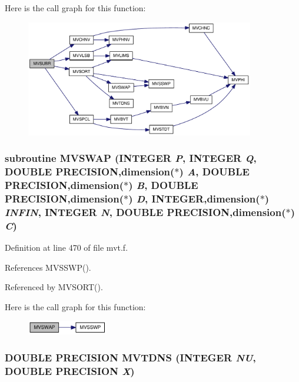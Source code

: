 Here is the call graph for this function:\nopagebreak
\begin{figure}[H]
\begin{center}
\leavevmode
\includegraphics[width=283pt]{mvt_8f_1e3a3eb63d17fe37f686fc1f571beccc_cgraph}
\end{center}
\end{figure}
\hypertarget{mvt_8f_5411cfeafe20ca2bd17c962f8c8c0e84}{
\subsubsection[{MVSWAP}]{\setlength{\rightskip}{0pt plus 5cm}subroutine MVSWAP (INTEGER {\em P}, \/  INTEGER {\em Q}, \/  DOUBLE PRECISION,dimension($\ast$) {\em A}, \/  DOUBLE PRECISION,dimension($\ast$) {\em B}, \/  DOUBLE PRECISION,dimension($\ast$) {\em D}, \/  INTEGER,dimension($\ast$) {\em INFIN}, \/  INTEGER {\em N}, \/  DOUBLE PRECISION,dimension($\ast$) {\em C})}}
\label{mvt_8f_5411cfeafe20ca2bd17c962f8c8c0e84}




Definition at line 470 of file mvt.f.

References MVSSWP().

Referenced by MVSORT().

Here is the call graph for this function:\nopagebreak
\begin{figure}[H]
\begin{center}
\leavevmode
\includegraphics[width=100pt]{mvt_8f_5411cfeafe20ca2bd17c962f8c8c0e84_cgraph}
\end{center}
\end{figure}
\hypertarget{mvt_8f_7edd239860c89b5fa9fb100b194fa833}{
\subsubsection[{MVTDNS}]{\setlength{\rightskip}{0pt plus 5cm}DOUBLE PRECISION MVTDNS (INTEGER {\em NU}, \/  DOUBLE PRECISION {\em X})}}
\label{mvt_8f_7edd239860c89b5fa9fb100b194fa833}





